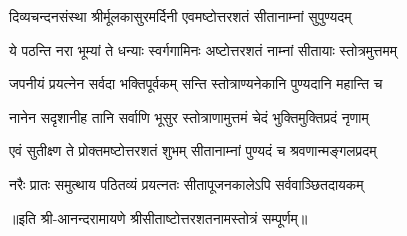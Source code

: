 \twolineshloka
{दिव्यचन्दनसंस्था श्रीर्मूलकासुरमर्दिनी}
{एवमष्टोत्तरशतं सीतानाम्नां सुपुण्यदम्}

\twolineshloka
{ये पठन्ति नरा भूम्यां ते धन्याः स्वर्गगामिनः}
{अष्टोत्तरशतं नाम्नां सीतायाः स्तोत्रमुत्तमम्}

\twolineshloka
{जपनीयं प्रयत्नेन सर्वदा भक्तिपूर्वकम्}
{सन्ति स्तोत्राण्यनेकानि पुण्यदानि महान्ति च}

\twolineshloka
{नानेन सदृशानीह तानि सर्वाणि भूसुर}
{स्तोत्राणामुत्तमं चेदं भुक्तिमुक्तिप्रदं नृणाम्}

\twolineshloka
{एवं सुतीक्ष्ण ते प्रोक्तमष्टोत्तरशतं शुभम्}
{सीतानाम्नां पुण्यदं च श्रवणान्मङ्गलप्रदम्}

\twolineshloka
{नरैः प्रातः समुत्थाय पठितव्यं प्रयत्नतः}
{सीतापूजनकालेऽपि सर्ववाञ्छितदायकम्}

{॥इति श्री-आनन्दरामायणे श्रीसीताष्टोत्तरशतनामस्तोत्रं सम्पूर्णम्॥}

